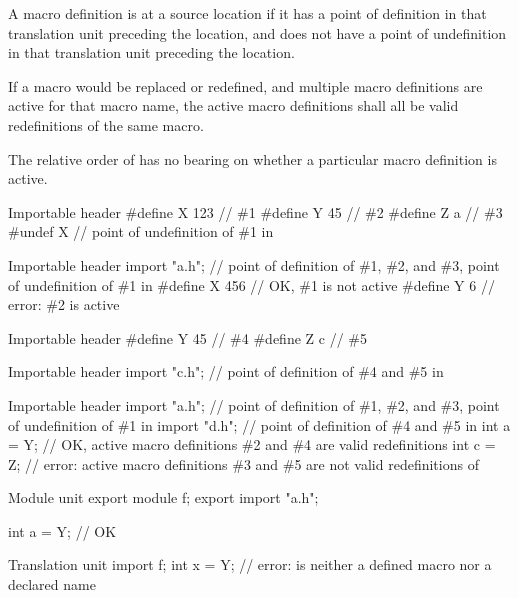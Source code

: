 \pnum
{}%
A macro definition is  at a source location
if it has a point of definition in that translation unit preceding the location,
and does not have a point of undefinition in that translation unit preceding
the location.

\pnum
If a macro would be replaced or redefined, and multiple macro definitions
are active for that macro name, the active macro definitions shall all be
valid redefinitions of the same macro.
\begin{note}
The relative order of  has no bearing on whether a
particular macro definition is active.
\end{note}

\pnum
\begin{example}
\begin{codeblocktu}{Importable header }
#define X 123   // \#1
#define Y 45    // \#2
#define Z a     // \#3
#undef X        // point of undefinition of \#1 in 
\end{codeblocktu}

\begin{codeblocktu}{Importable header }
import "a.h";   // point of definition of \#1, \#2, and \#3, point of undefinition of \#1 in 
#define X 456   // OK, \#1 is not active
#define Y 6     // error: \#2 is active
\end{codeblocktu}

\begin{codeblocktu}{Importable header }
#define Y 45    // \#4
#define Z c     // \#5
\end{codeblocktu}

\begin{codeblocktu}{Importable header }
import "c.h";   // point of definition of \#4 and \#5 in 
\end{codeblocktu}

\begin{codeblocktu}{Importable header }
import "a.h";   // point of definition of \#1, \#2, and \#3, point of undefinition of \#1 in 
import "d.h";   // point of definition of \#4 and \#5 in 
int a = Y;      // OK, active macro definitions \#2 and \#4 are valid redefinitions
int c = Z;      // error: active macro definitions \#3 and \#5 are not valid redefinitions of 
\end{codeblocktu}

\begin{codeblocktu}{Module unit }
export module f;
export import "a.h";

int a = Y;      // OK
\end{codeblocktu}

\begin{codeblocktu}{Translation unit }
import f;
int x = Y;      // error:  is neither a defined macro nor a declared name
\end{codeblocktu}
\end{example}

